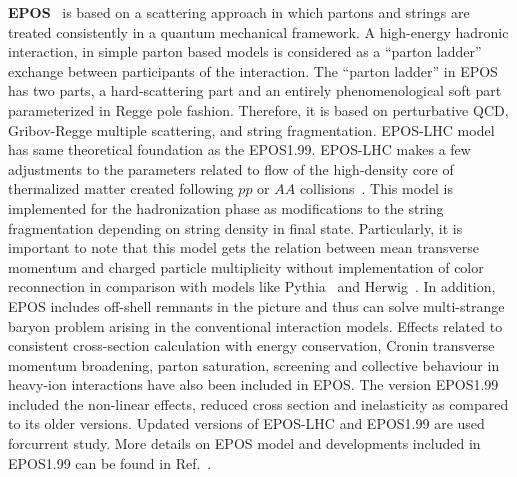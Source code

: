 \documentclass{article}
\begin{document}
{\bf EPOS}~\cite{Pierog:2009zt} is based on a scattering approach in which partons and strings are treated consistently in a quantum mechanical framework. A high-energy hadronic interaction, in simple parton based models is considered as a “parton ladder” exchange between participants of the interaction. The “parton ladder” in EPOS has two parts, a hard-scattering part and an entirely phenomenological soft part parameterized in Regge pole fashion. Therefore, it is based on perturbative QCD, Gribov-Regge multiple scattering, and string fragmentation. EPOS-LHC model has same theoretical foundation as the EPOS1.99. EPOS-LHC makes a few adjustments to the parameters related to flow of the high-density core of thermalized matter created following $pp$ or $AA$ collisions~\cite{Pierog:2013ria}. This model is implemented for the hadronization phase as modifications to the string fragmentation depending on string density in final state. Particularly, it is important to note that this model gets the relation between mean transverse momentum and charged particle multiplicity without implementation of color reconnection in comparison with models like Pythia~\cite{Sjostrand:2007gs} and Herwig~\cite{Bellm:2015jjp}. In addition, EPOS includes off-shell remnants in the picture and thus can solve multi-strange baryon problem arising in the conventional interaction models. Effects related to consistent cross-section calculation with energy conservation, Cronin transverse momentum broadening, parton saturation, screening and collective behaviour in heavy-ion interactions have also been included in EPOS. The version EPOS1.99 included the non-linear effects, reduced cross section and inelasticity as compared to its older versions. Updated versions of EPOS-LHC and EPOS1.99 are used forcurrent study. More details on EPOS model and developments included in EPOS1.99 can be found in Ref.~\cite{Pierog:2009zt}.
\end{document}

